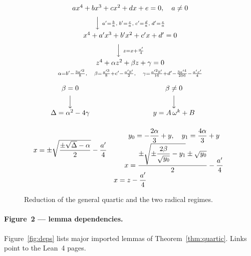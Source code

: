 \documentclass[11pt,a4paper]{article}
\begin{document}
\begin{figure}[ht]
\centering
\footnotesize
\[
\begin{array}{c}
a x^{4}+b x^{3}+c x^{2}+d x+e=0,\quad a\neq 0 \\[0.6em]
\Big\downarrow\ \scriptstyle a'=\frac{b}{a},\; b'=\frac{c}{a},\; c'=\frac{d}{a},\; d'=\frac{e}{a} \\[0.6em]
x^{4}+a' x^{3}+b' x^{2}+c' x+d'=0 \\[0.6em]
\Big\downarrow\ \scriptstyle z=x+\frac{a'}{4} \\[0.6em]
z^{4}+\alpha z^{2}+\beta z+\gamma=0 \\[0.25em]
\scriptstyle
\alpha=b'-\frac{3a'^{2}}{8},\quad
\beta=\frac{a'^{3}}{8}+c'-\frac{a'b'}{2},\quad
\gamma=\frac{a'^{2}b'}{16}+d'-\frac{3a'^{4}}{256}-\frac{a'c'}{4}
\\[1.0em]
\begin{array}{c@{\qquad}c}
\beta=0 & \beta\neq 0 \\[0.4em]
\Big\downarrow & \Big\downarrow \\[0.4em]
\Delta=\alpha^{2}-4\gamma &
y=A\,\omega^{k}+B
\\[1.6em]
x=\pm\sqrt{\dfrac{\pm\sqrt{\Delta}-\alpha}{2}}-\dfrac{a'}{4}
&
\begin{array}{c}
y_{0}=-\dfrac{2\alpha}{3}+y,\quad y_{1}=\dfrac{4\alpha}{3}+y \\[0.45em]
x=\dfrac{\pm\sqrt{\pm\dfrac{2\beta}{\sqrt{y_{0}}}-y_{1}}\pm\sqrt{y_{0}}}{2}-\dfrac{a'}{4}
\end{array}
\end{array}
\\[1.0em]
x=z-\dfrac{a'}{4}
\end{array}
\]
\caption{Reduction of the general quartic and the two radical regimes.}
\label{fig:reduction}
\end{figure}

\paragraph{Figure~2 --- lemma dependencies.}
Figure~\ref{fig:deps} lists major imported lemmas of Theorem~\ref{thm:quartic}.
Links point to the Lean~4 pages.
\end{document}
